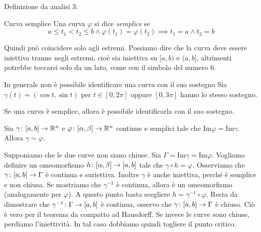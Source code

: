 \documentclass[a4paper]{article}
\begin{document}
\begin{radioactive}
Definizione da analisi 3:
\begin{snippetdefinition}{Curva semplice}
    Una curva \(\varphi\) si dice \emph{semplice} se
    \[
        a \leq t_1 < t_2 \leq b \land \varphi(t_1) = \varphi(t_2)
        \implies t_1 = a \land t_2 = b
    \]
\end{snippetdefinition}
\end{radioactive}

Quindi può coincidere solo agli estremi.
Possiamo dire che la curva deve essere iniettiva tranne negli estremi,
cioè sia iniettiva su \([a,b)\) e \((a,b]\),
altrimenti potrebbe toccarsi solo da un lato, come con il simbolo del numero 6.

\begin{snippetexample}{In generale non è possibile identificare una curva con il suo sostegno}
    Sia \(\gamma(t) = (\cos t, \sin t)\)
    per \(t \in [0, 2\pi]\) oppure
    \([0, 3\pi]\) hanno lo stesso sostegno.
\end{snippetexample}

Se una curva è semplice, allora è possibile identificarla con il suo sostegno.

\begin{snippettheorem}{}
    Sia \(\gamma \colon [a,b] \to \mathbb{R}^n\)
    e \(\varphi \colon [\alpha, \beta] \to \mathbb{R}^n\)
    continue e semplici tale che \(\text{Im}\varphi = \text{Im} \gamma\).
    Allora \(\gamma \sim \varphi\).
\end{snippettheorem}

\begin{snippetproof}{}
    Supponiamo che le due curve non siano chiuse.
    Sia \(\Gamma = \text{Im} \gamma = \text{Im} \varphi\).
    Vogliamo definire un omeomorfismo \(h \colon [\alpha,\beta] \to [a,b]\)
    tale che \(\gamma \circ h = \varphi\).
    Osserviamo che \(\gamma \colon [a,b] \to \Gamma\) è continua e suriettiva.
    Inoltre \(\gamma\) è anche iniettiva, perché è semplice e non chiusa.
    Se mostriamo che \(\gamma^{-1}\) è continua, allora è un omeomorfismo (analogamente per \(\varphi\)).
    A questo punto basta scegliere \(h = \gamma^{-1} \circ \varphi\).
    Resta da dimostrare che \(\gamma^{-1} \colon \Gamma \to [a,b]\)
    è continua, osservo che \(\gamma \colon [a,b] \to \Gamma\) è chiuso.
    Ciò è vero per il teorema da compatto ad Hausdorff.
    Se invece le curve sono chiuse, perdiamo l'iniettività.
    In tal caso dobbiamo quindi togliere il punto critico.
\end{snippetproof}
\end{document}

